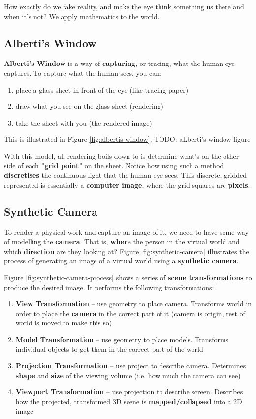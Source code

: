 \documentclass{article}
\begin{document}
How exactly do we fake reality, and make the eye think something us there and when it's not? We apply mathematics to the world.

\subsection{Alberti's Window}
\label{sec:albertis-window}

\textbf{Alberti's Window} is a way of \textbf{capturing}, or tracing, what the human eye captures. To capture what the human sees, you can:
\begin{enumerate}
	\item place a glass sheet in front of the eye (like tracing paper)
	\item draw what you see on the glass sheet (rendering)
	\item take the sheet with you (the rendered image)
\end{enumerate}
This is illustrated in Figure \ref{fig:albertis-window}. TODO: aLberti's window figure

With this model, all rendering boils down to is determine what's on the other side of each \textbf{"grid point"} on the sheet. Notice how using such a method \textbf{discretises} the continuous light that the human eye sees. This discrete, gridded represented is essentially                                               a \textbf{computer image}, where the grid squares are \textbf{pixels}.

\subsection{Synthetic Camera}

To render a physical work and capture an image of it, we need to have some way of modelling the \textbf{camera}. That is, \textbf{where} the person in the virtual world and which \textbf{direction} are they looking at? Figure \ref{fig:synthetic-camera} illustrates the process of generating an image of a virtual world using a \textbf{synthetic camera}.

Figure \ref{fig:synthetic-camera-process} shows a series of \textbf{scene transformations} to produce the desired image. It performs the following transformations:
\begin{enumerate}
	\item \textbf{View Transformation} -- use geometry to place camera. Transforms world in order to place the \textbf{camera} in the correct part of it (camera is origin, rest of world is moved to make this so)
	\item \textbf{Model Transformation} -- use geometry to place models. Transforms individual objects to get them in the correct part of the world
	\item \textbf{Projection Transformation} -- use project to describe camera. Determines \textbf{shape} and \textbf{size} of the viewing volume (i.e. how much the camera can see)
	\item \textbf{Viewport Transformation} -- use projection to describe screen. Describes how the projected, transformed 3D scene is \textbf{mapped/collapsed} into a 2D image
\end{enumerate}
\end{document}
